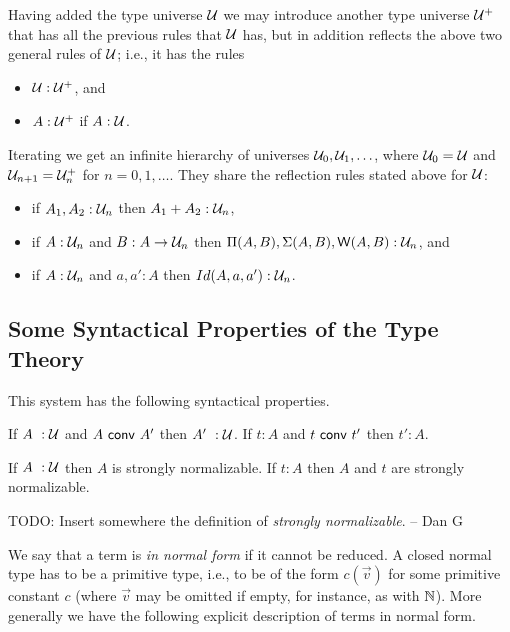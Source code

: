 Having added the type universe $\mathcal{U}$ we may introduce another type universe
$\mathcal{U}^+$ that has all the previous rules that $\mathcal{U}$ has, but in addition reflects the above two general rules of $\mathcal{U}$; i.e., it has the rules

\medskip

\begin{itemize}
\item $\mathcal{U}:\mathcal{U}^+$, and
\item $A:\mathcal{U}^+$ if $A:\mathcal{U}$.
\end{itemize}

\medskip

Iterating we get an infinite hierarchy of universes $\mathcal{U}_0,\mathcal{U}_1,\ldots$, where
$\mathcal{U}_0=\mathcal{U}$ and $\mathcal{U}_{n+1}=\mathcal{U}_n^+$ for $n=0,1,\ldots$.  They share the reflection rules
stated above for $\mathcal{U}$:

\begin{itemize}
\item if $A_1,A_2:\mathcal{U}_n$ then $A_1+A_2:\mathcal{U}_n$,
\item if $A:\mathcal{U}_n$ and $B:A\rightarrow\mathcal{U}_n$ then     $\Pi(A,B),\Sigma(A,B),{\sf W}(A,B):\mathcal{U}_n$, and 
\item if $A:\mathcal{U}_n$ and $a,a':A$ then $Id(A,a,a'):\mathcal{U}_n$.
\end{itemize}

\medskip
\subsection*{Some Syntactical Properties of the Type Theory}
 This system has the following syntactical properties.

\begin{thm}\label{red}
If $A~ : \mathcal{U}$ and $A ~{\sf conv}~ A'$ then $A'~ : \mathcal{U}$.
If $t:A$ and $t ~{\sf conv}~ t'$ then $t':A$.
\end{thm}

\begin{thm}\label{SN}
 If $A~ : \mathcal{U}$ then $A$ is strongly normalizable.
If $t:A$ then $A$ and $t$ are strongly normalizable. 
\end{thm}

TODO: Insert somewhere the definition of {\em strongly normalizable}. -- Dan G

 We say that a term is {\em in normal form} if it cannot be reduced.
A closed normal type has to be a primitive type, i.e., to be of the form $c(\vec{v})$ for some
primitive constant $c$ (where $\vec{v}$ may be omitted if empty, for instance, as with $\mathbb{N}$). 
More generally we have the following explicit description of terms in normal form.

